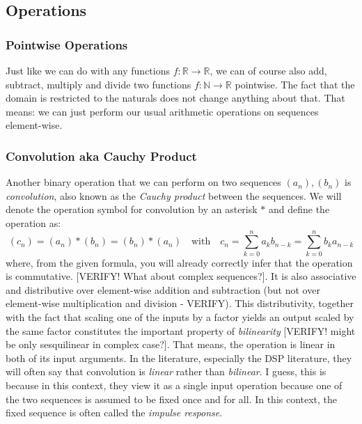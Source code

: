 
\subsection{Operations}

\subsubsection{Pointwise Operations}
Just like we can do with any functions $f: \mathbb{R} \rightarrow \mathbb{R}$, we can of course also add, subtract, multiply and divide two functions $f: \mathbb{N} \rightarrow \mathbb{R}$ pointwise. The fact that the domain is restricted to the naturals does not change anything about that. That means: we can just perform our usual arithmetic operations on sequences element-wise.

\subsubsection{Convolution aka Cauchy Product}
Another binary operation that we can perform on two sequences $(a_n),(b_n)$ is \emph{convolution}, also known as the \emph{Cauchy product} between the sequences. We will denote the operation symbol for convolution by an asterisk $\ast$ and define the operation as:
\begin{equation}
 (c_n) = (a_n) \ast (b_n) = (b_n) \ast (a_n) \quad \text{with} \quad
 c_n = \sum_{k=0}^n a_k b_{n-k} = \sum_{k=0}^n b_k a_{n-k}
\end{equation}
where, from the given formula, you will already correctly infer that the operation is commutative.
[VERIFY! What about complex sequences?]. It is also associative and distributive over element-wise addition and subtraction (but not over element-wise multiplication and division - VERIFY). This distributivity, together with the fact that scaling one of the inputs by a factor yields an output scaled by the same factor constitutes the important property of \emph{bilinearity} [VERIFY! might be only sesquilinear in complex case?]. That means, the operation is linear in both of its input arguments. In the literature, especially the DSP literature, they will often say that convolution is \emph{linear} rather than \emph{bilinear}. I guess, this is because in this context, they view it as a single input operation because one of the two sequences is assumed to be fixed once and for all. In this context, the fixed sequence is often called the \emph{impulse response}.

